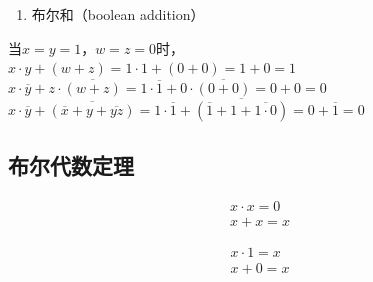 \begin{enumerate}
	\item 布尔和（boolean addition）
	      \begin{table}[H]
		      \centering
	      \end{table}
\end{enumerate}

\begin{tcolorbox}
	当$ x = y = 1 $，$ w = z = 0 $时，\\
	$ x \cdot y + (w + z) = 1 \cdot 1 + (0 + 0) = 1 + 0 = 1 $\\
	$ x \cdot \overline y + z \cdot \overline{(w + z)} = 1 \cdot \overline 1 + 0 \cdot \overline{(0 + 0)} = 0 + 0 = 0 $\\
	$ x \cdot \overline y + \overline{(\overline x + y + \overline{yz})} = 1 \cdot \overline 1 + \overline{(\overline 1 + 1 + \overline{1 \cdot 0})} = 0 + \overline 1 = 0 $
\end{tcolorbox}

\vspace{0.5cm}

\subsection{布尔代数定理}

\begin{tcolorbox}
	\begin{align}
		x \cdot x = 0 \\
		x + x = x
	\end{align}
\end{tcolorbox}

\begin{tcolorbox}
	\begin{align}
		x \cdot 1 = x \\
		x + 0 = x
	\end{align}
\end{tcolorbox}

